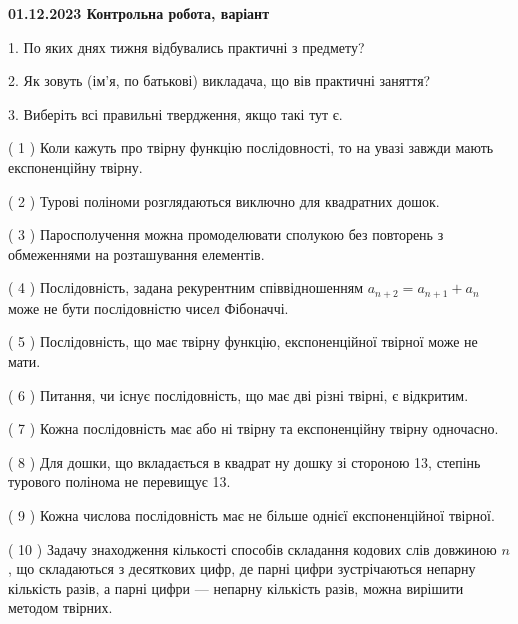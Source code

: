 \documentclass[12pt, ukrainian]{article}
\begin{document}
\vspace{4mm}
\newpage
\begin {large}

\textbf{01.12.2023 Контрольна робота, варіант  }\par


{
1. По яких днях тижня відбувались практичні з предмету?



\vspace{5mm}
2. Як зовуть (ім'я, по батькові) викладача, що вів практичні заняття?



\vspace{5mm}
3. Виберіть всі правильні твердження, якщо такі тут є.\par
\vspace{2mm}
( 1 ) Коли кажуть про твірну функцію послідовності, то на увазі завжди мають експоненційну твірну.%

( 2 ) Турові поліноми розглядаються виключно для квадратних дошок.%

( 3 ) Паросполучення можна промоделювати сполукою без повторень з обмеженнями на розташування елементів.%

( 4 ) Послідовність, задана рекурентним співвідношенням $a_{n+2}=a_{n+1}+a_{n}$ може не бути послідовністю чисел Фібоначчі.%

( 5 ) Послідовність, що має твірну функцію, експоненційної твірної може не мати.%

( 6 ) Питання, чи існує послідовність, що має дві різні твірні, є відкритим.%

( 7 ) Кожна послідовність має або ні твірну та експоненційну твірну одночасно.%

( 8 ) Для дошки, що вкладається в квадрат ну дошку зі стороною 13, степінь турового полінома не перевищує 13.%

( 9 ) Кожна числова послідовність має не більше однієї  експоненційної твірної.%

( 10 ) Задачу знаходження кількості способів складання кодових слів довжиною $n$, що складаються з десяткових цифр, де парні цифри зустрічаються непарну кількість разів, а парні цифри — непарну кількість разів, можна вирішити методом твірних.%
}
\end {large}
\end{document}
